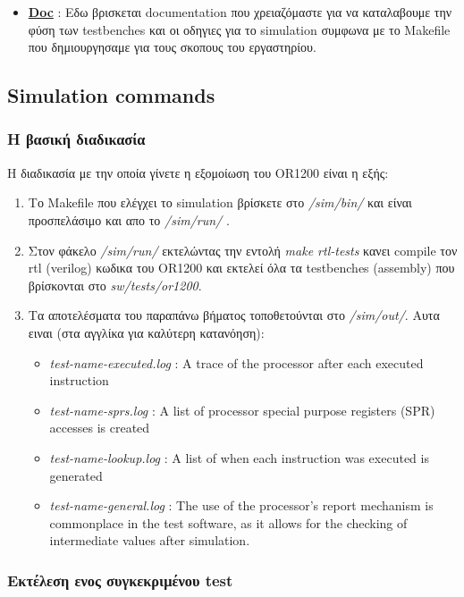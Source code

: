 \documentclass[a4paper,10pt]{article}
\numberwithin{figure}{subsection}
\numberwithin{table}{subsection}
\begin{document}
{{\begin{itemize}
\item \underline{{\bf Doc}} : Εδω βρισκεται documentation που χρειαζόμαστε για να καταλαβουμε την φύση των
testbenches και οι οδηγιες για το simulation συμφωνα με το Makefile που δημιουργησαμε για τους σκοπους του εργαστηρίου.
\end{itemize}
}



\subsection{Simulation commands}{
{
\subsubsection{ Η βασική διαδικασία}
{

Η διαδικασία με την οποία γίνετε η εξομοίωση του OR1200 είναι η εξής:
\begin{enumerate}
 \item Το Makefile που ελέγχει το simulation βρίσκετε στο \emph{/sim/bin/} και είναι προσπελάσιμο και απο το \emph{/sim/run/} .
 \item Στον φάκελο \emph{/sim/run/} εκτελώντας την εντολή \emph{make rtl-tests} κανει compile τον rtl
(verilog) κωδικα του OR1200 και εκτελεί όλα τα testbenches (assembly) που βρίσκονται στο \emph{sw/tests/or1200}.
 \item Tα αποτελέσματα του παραπάνω βήματος τοποθετούνται στο \emph{/sim/out/}. Aυτα ειναι (στα αγγλίκα για καλύτερη κατανόηση):
    \begin{itemize}
     \item \emph{test-name-executed.log} : A trace of the processor after each executed instruction
     \item \emph{test-name-sprs.log} : A list of processor special purpose registers (SPR) accesses is created
     \item \emph{test-name-lookup.log} : A list of when each instruction was executed is generated
     \item \emph{test-name-general.log} : The use of the processor’s report mechanism is commonplace in the
test software, as it allows for the checking of intermediate values after simulation.
    \end{itemize}
\end{enumerate}
}

\subsubsection{ Εκτέλεση ενος συγκεκριμένου test}
{

}}}}
\end{document}
